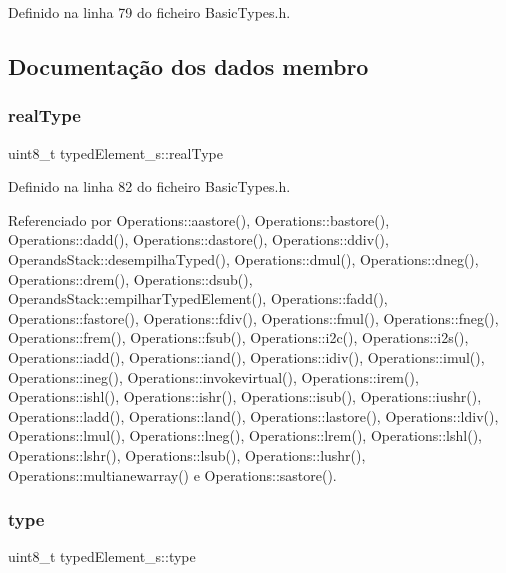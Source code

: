 Definido na linha 79 do ficheiro Basic\+Types.\+h.



\subsection{Documentação dos dados membro}
\mbox{\label{structtypedElement__s_a265d7ad822f91bfa8fd6eb292e2d20d8}} 
\subsubsection{\texorpdfstring{real\+Type}{realType}}
{\footnotesize\ttfamily uint8\+\_\+t typed\+Element\+\_\+s\+::real\+Type}



Definido na linha 82 do ficheiro Basic\+Types.\+h.



Referenciado por Operations\+::aastore(), Operations\+::bastore(), Operations\+::dadd(), Operations\+::dastore(), Operations\+::ddiv(), Operands\+Stack\+::desempilha\+Typed(), Operations\+::dmul(), Operations\+::dneg(), Operations\+::drem(), Operations\+::dsub(), Operands\+Stack\+::empilhar\+Typed\+Element(), Operations\+::fadd(), Operations\+::fastore(), Operations\+::fdiv(), Operations\+::fmul(), Operations\+::fneg(), Operations\+::frem(), Operations\+::fsub(), Operations\+::i2c(), Operations\+::i2s(), Operations\+::iadd(), Operations\+::iand(), Operations\+::idiv(), Operations\+::imul(), Operations\+::ineg(), Operations\+::invokevirtual(), Operations\+::irem(), Operations\+::ishl(), Operations\+::ishr(), Operations\+::isub(), Operations\+::iushr(), Operations\+::ladd(), Operations\+::land(), Operations\+::lastore(), Operations\+::ldiv(), Operations\+::lmul(), Operations\+::lneg(), Operations\+::lrem(), Operations\+::lshl(), Operations\+::lshr(), Operations\+::lsub(), Operations\+::lushr(), Operations\+::multianewarray() e Operations\+::sastore().

\mbox{\label{structtypedElement__s_a725ddec1b2a04b6488cdde81f3e0255e}} 
\subsubsection{\texorpdfstring{type}{type}}
{\footnotesize\ttfamily uint8\+\_\+t typed\+Element\+\_\+s\+::type}



